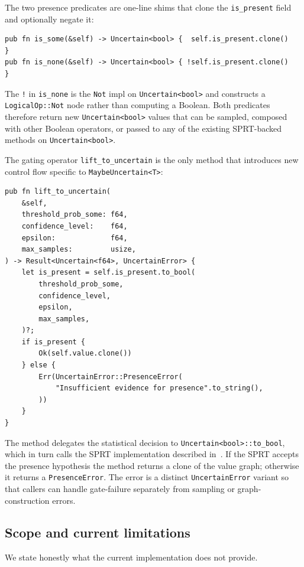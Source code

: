 The two presence predicates are one-line shims that clone the
\texttt{is\_present} field and optionally negate it:

\begin{lstlisting}
pub fn is_some(&self) -> Uncertain<bool> {  self.is_present.clone()   }
pub fn is_none(&self) -> Uncertain<bool> { !self.is_present.clone()   }
\end{lstlisting}

The \texttt{!} in \texttt{is\_none} is the \texttt{Not} impl on
\texttt{Uncertain<bool>} and constructs a \texttt{LogicalOp::Not} node
rather than computing a Boolean. Both predicates therefore return new
\texttt{Uncertain<bool>} values that can be sampled, composed with other
Boolean operators, or passed to any of the existing SPRT-backed methods on
\texttt{Uncertain<bool>}.

The gating operator \texttt{lift\_to\_uncertain} is the only method that
introduces new control flow specific to \texttt{MaybeUncertain<T>}:

\begin{lstlisting}
pub fn lift_to_uncertain(
    &self,
    threshold_prob_some: f64,
    confidence_level:    f64,
    epsilon:             f64,
    max_samples:         usize,
) -> Result<Uncertain<f64>, UncertainError> {
    let is_present = self.is_present.to_bool(
        threshold_prob_some,
        confidence_level,
        epsilon,
        max_samples,
    )?;
    if is_present {
        Ok(self.value.clone())
    } else {
        Err(UncertainError::PresenceError(
            "Insufficient evidence for presence".to_string(),
        ))
    }
}
\end{lstlisting}

The method delegates the statistical decision to
\texttt{Uncertain<bool>::to\_bool}, which in turn calls the SPRT
implementation described in~. If the SPRT
accepts the presence hypothesis the method returns a clone of the value
graph; otherwise it returns a \texttt{PresenceError}. The error is a
distinct \texttt{UncertainError} variant so that callers can handle
gate-failure separately from sampling or graph-construction errors.

\subsection{Scope and current limitations}
\label{sec:impl:scope}

We state honestly what the current implementation does not provide.

